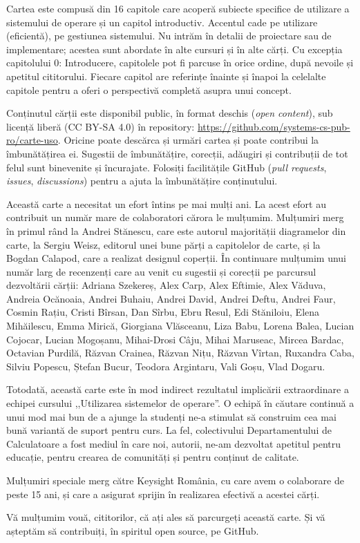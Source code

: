 Cartea este compusă din 16 capitole care acoperă subiecte specifice de utilizare a sistemului de operare și un capitol introductiv.
Accentul cade pe utilizare (eficientă), pe gestiunea sistemului.
Nu intrăm în detalii de proiectare sau de implementare; acestea sunt abordate în alte cursuri și în alte cărți.
Cu excepția capitolului 0: Introducere, capitolele pot fi parcuse în orice ordine, după nevoile și apetitul cititorului.
Fiecare capitol are referințe înainte și înapoi la celelalte capitole pentru a oferi o perspectivă completă asupra unui concept.

Conținutul cărții este disponibil public, în format deschis (\textit{open content}), sub licență liberă (CC BY-SA 4.0) în repository: \url{https://github.com/systems-cs-pub-ro/carte-uso}.
Oricine poate descărca și urmări cartea și poate contribui la îmbunătățirea ei.
Sugestii de îmbunătățire, corecții, adăugiri și contribuții de tot felul sunt binevenite și încurajate.
Folosiți facilitățile GitHub (\textit{pull requests}, \textit{issues}, \textit{discussions}) pentru a ajuta la îmbunătățire conținutului.

Această carte a necesitat un efort întins pe mai mulți ani.
La acest efort au contribuit un număr mare de colaboratori cărora le mulțumim.
Mulțumiri merg în primul rând la Andrei Stănescu, care este autorul majorității diagramelor din carte, la Sergiu Weisz, editorul unei bune părți a capitolelor de carte, și la Bogdan Calapod, care a realizat designul coperții.
În continuare mulțumim unui număr larg de recenzenți care au venit cu sugestii și corecții pe parcursul dezvoltării cărții: Adriana Szekereș, Alex Carp, Alex Eftimie, Alex Văduva, Andreia Ocănoaia, Andrei Buhaiu, Andrei David, Andrei Deftu, Andrei Faur, Cosmin Rațiu, Cristi Bîrsan, Dan Sîrbu, Ebru Resul, Edi Stăniloiu, Elena Mihăilescu, Emma Mirică, Giorgiana Vlăsceanu, Liza Babu, Lorena Balea, Lucian Cojocar, Lucian Mogoșanu, Mihai-Drosi Câju, Mihai Maruseac, Mircea Bardac, Octavian Purdilă, Răzvan Crainea, Răzvan Nițu, Răzvan Vîrtan, Ruxandra Caba, Silviu Popescu, Ștefan Bucur, Teodora Argintaru, Vali Goșu, Vlad Dogaru.

Totodată, această carte este în mod indirect rezultatul implicării extraordinare a echipei cursului ,,Utilizarea sistemelor de operare''.
O echipă în căutare continuă a unui mod mai bun de a ajunge la studenți ne-a stimulat să construim cea mai bună variantă de suport pentru curs.
La fel, colectivului Departamentului de Calculatoare a fost mediul în care noi, autorii, ne-am dezvoltat apetitul pentru educație, pentru crearea de comunități și pentru conținut de calitate.

Mulțumiri speciale merg către Keysight România, cu care avem o colaborare de peste 15 ani, și care a asigurat sprijin în realizarea efectivă a acestei cărți.

Vă mulțumim vouă, cititorilor, că ați ales să parcurgeți această carte.
Și vă așteptăm să contribuiți, în spiritul open source, pe GitHub.
